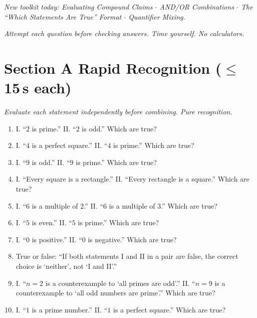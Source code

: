 \documentclass[11pt,a4paper]{article}
\begin{document}
\noindent\textit{New toolkit today: Evaluating Compound Claims $\cdot$ AND/OR Combinations $\cdot$ The ``Which Statements Are True'' Format $\cdot$ Quantifier Mixing.}

\vspace{2pt}
\noindent\textit{Attempt each question before checking answers. Time yourself. No calculators.}

\section*{Section A \quad Rapid Recognition \hfill{\normalfont\small($\leq$15\,s each)}}

\noindent\textit{Evaluate each statement independently before combining. Pure recognition.}

\begin{enumerate}

\item I. ``$2$ is prime.'' II. ``$2$ is odd.'' Which are true?

\item I. ``$4$ is a perfect square.'' II. ``$4$ is prime.'' Which are true?

\item I. ``$9$ is odd.'' II. ``$9$ is prime.'' Which are true?

\item I. ``Every square is a rectangle.'' II. ``Every rectangle is a square.'' Which are true?

\item I. ``$6$ is a multiple of $2$.'' II. ``$6$ is a multiple of $3$.'' Which are true?

\item I. ``$5$ is even.'' II. ``$5$ is prime.'' Which are true?

\item I. ``$0$ is positive.'' II. ``$0$ is negative.'' Which are true?

\item True or false: ``If both statements I and II in a pair are false, the correct choice is `neither', not `I and II'.''

\item I. ``$n=2$ is a counterexample to `all primes are odd'.'' II. ``$n=9$ is a counterexample to `all odd numbers are prime'.'' Which are true?

\item I. ``$1$ is a prime number.'' II. ``$1$ is a perfect square.'' Which are true?

\end{enumerate}
\end{document}
